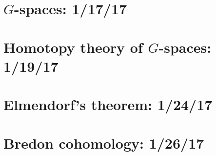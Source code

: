\documentclass{style_EHT}
\begin{document}
\frontstuff

\section{$G$-spaces: 1/17/17}
	
\section{Homotopy theory of $G$-spaces: 1/19/17}
	
\section{Elmendorf's theorem: 1/24/17}
	
\section{Bredon cohomology: 1/26/17}
	



{}

\end{document}
